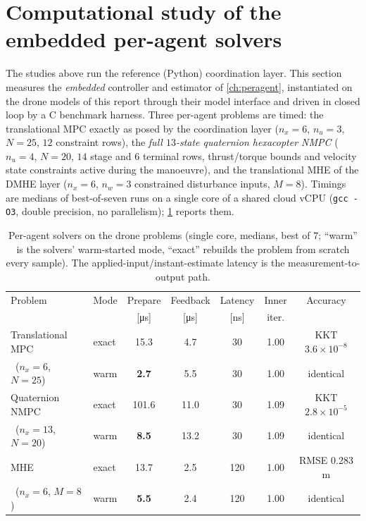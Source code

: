 \section{Computational study of the embedded per-agent solvers}
\label{sec:sim-compute}

The studies above run the reference (Python) coordination layer. This section
measures the \emph{embedded} controller and estimator of \cref{ch:peragent},
instantiated on the drone models of this report through their model interface
and driven in closed loop by a C benchmark harness. Three per-agent
problems are timed: the translational MPC exactly as posed by the coordination
layer ($n_x{=}6$, $n_u{=}3$, $N{=}25$, $12$ constraint rows), the \emph{full
$13$-state quaternion hexacopter NMPC} ($n_u{=}4$, $N{=}20$, $14$ stage and $6$
terminal rows, thrust/torque bounds and velocity state constraints active during
the manoeuvre), and the translational MHE of the DMHE layer ($n_x{=}6$,
$n_w{=}3$ constrained disturbance inputs, $M{=}8$). Timings are medians of
best-of-seven runs on a single core of a shared cloud vCPU
(\texttt{gcc -O3}, double precision, no parallelism); \cref{tab:compute}
reports them.

\begin{table}[t]
\centering
\caption{Per-agent solvers on the drone problems (single core, medians, best of
$7$; ``warm'' is the solvers' warm-started mode, ``exact'' rebuilds the
problem from scratch every sample). The applied-input/instant-estimate latency
is the measurement-to-output path.}
\label{tab:compute}
\small
\begin{tabular}{@{}llccccc@{}}
\toprule
Problem & Mode & Prepare & Feedback & Latency & Inner & Accuracy\\
 & & [\si{\micro\second}] & [\si{\micro\second}] & [\si{\nano\second}] & iter. & \\
\midrule
Translational MPC & exact & 15.3 & 4.7 & 30 & 1.00 & KKT $3.6{\times}10^{-8}$\\
\ ($n_x{=}6$, $N{=}25$) & warm & \textbf{2.7} & 5.5 & 30 & 1.00 & identical\\
\midrule
Quaternion NMPC & exact & 101.6 & 11.0 & 30 & 1.09 & KKT $2.8{\times}10^{-5}$\\
\ ($n_x{=}13$, $N{=}20$) & warm & \textbf{8.5} & 13.2 & 30 & 1.09 & identical\\
\midrule
MHE & exact & 13.7 & 2.5 & 120 & 1.00 & RMSE 0.283 m\\
\ ($n_x{=}6$, $M{=}8$) & warm & \textbf{5.5} & 2.4 & 120 & 1.00 & identical\\
\bottomrule
\end{tabular}
\end{table}

